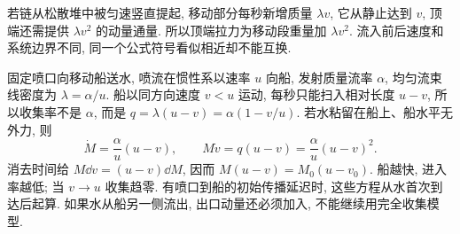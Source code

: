 若链从松散堆中被匀速竖直提起, 移动部分每秒新增质量 $\lambda v$, 它从静止达到 $v$, 顶端还需提供 $\lambda v^2$ 的动量通量. 所以顶端拉力为移动段重量加 $\lambda v^2$. 流入前后速度和系统边界不同, 同一个公式符号看似相近却不能互换.

固定喷口向移动船送水, 喷流在惯性系以速率 $u$ 向船, 发射质量流率 $\alpha$, 均匀流束线密度为 $\lambda=\alpha/u$. 船以同方向速度 $v<u$ 运动, 每秒只能扫入相对长度 $u-v$, 所以收集率不是 $\alpha$, 而是 $q=\lambda(u-v)=\alpha(1-v/u)$. 若水粘留在船上、船水平无外力, 则
\[\dot M=\frac\alpha u(u-v),\qquad M\dot v=q(u-v)=\frac\alpha u(u-v)^2.\]
消去时间给 $M\dd v=(u-v)\dd M$, 因而 $M(u-v)=M_0(u-v_0)$. 船越快, 进入率越低; 当 $v\to u$ 收集趋零. 有喷口到船的初始传播延迟时, 这些方程从水首次到达后起算. 如果水从船另一侧流出, 出口动量还必须加入, 不能继续用完全收集模型.
